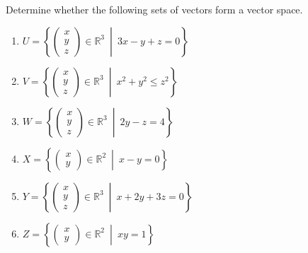 \begin{question}
Determine whether the following sets of vectors form a vector space.
\end{question}
\begin{enumerate}[label=\alph*)]
    \item $U = \left\{
    \begin{pmatrix}x\\y\\z\end{pmatrix} \in \mathbb{R}^3 \ \middle| \ 3x - y + z = 0
    \right\}$
    \item $V = \left\{
    \begin{pmatrix}x\\y\\z\end{pmatrix} \in \mathbb{R}^3 \ \middle| \ x^2 + y^2 \le z^2
    \right\}$
    \item $W = \left\{
    \begin{pmatrix}x\\y\\z\end{pmatrix} \in \mathbb{R}^3 \ \middle| \ 2y - z = 4
    \right\}$
    \item $X = \left\{
    \begin{pmatrix}x\\y\end{pmatrix} \in \mathbb{R}^2 \ \middle| \ x - y = 0
    \right\}$
    \item $Y = \left\{
    \begin{pmatrix}x\\y\\z\end{pmatrix} \in \mathbb{R}^3 \ \middle| \ x + 2y + 3z = 0
    \right\}$
    \item $Z = \left\{
    \begin{pmatrix}x\\y\end{pmatrix} \in \mathbb{R}^2 \ \middle| \ xy = 1
    \right\}$
\end{enumerate}

